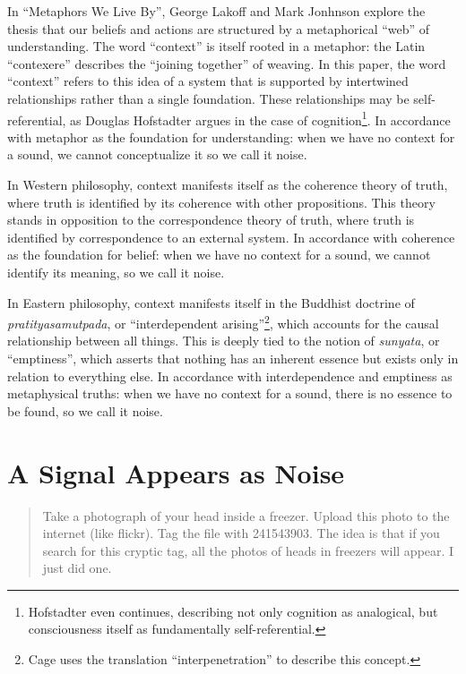 \documentclass{thesis}
\begin{document}
In ``Metaphors We Live By'', George Lakoff and Mark Jonhnson explore the thesis that our beliefs and actions are structured by a metaphorical ``web'' of understanding. The word ``context'' is itself rooted in a metaphor: the Latin ``contexere'' describes the ``joining together'' of weaving. In this paper, the word ``context'' refers to this idea of a system that is supported by intertwined relationships rather than a single foundation. These relationships may be self-referential, as Douglas Hofstadter argues in the case of cognition\cite{Hofstadter01}\footnote{Hofstadter even continues, describing not only cognition as analogical, but consciousness itself as fundamentally self-referential\cite{Hofstadter07}.}. In accordance with metaphor as the foundation for understanding: when we have no context for a sound, we cannot conceptualize it so we call it noise.

In Western philosophy, context manifests itself as the coherence theory of truth\cite{Blackburn07}\cite{young_coherence_????}, where truth is identified by its coherence with other propositions. This theory stands in opposition to the correspondence\cite{david_correspondence_????} theory of truth, where truth is identified by correspondence to an external system. In accordance with coherence as the foundation for belief: when we have no context for a sound, we cannot identify its meaning, so we call it noise.

In Eastern philosophy, context manifests itself in the Buddhist doctrine of \emph{pratityasamutpada}, or ``interdependent arising''\footnote{Cage uses the translation ``interpenetration'' to describe this concept.}, which accounts for the causal relationship between all things.\cite{Koller01} This is deeply tied to the notion of \emph{sunyata}, or ``emptiness'', which asserts that nothing has an inherent essence but exists only in relation to everything else. In accordance with interdependence and emptiness as metaphysical truths: when we have no context for a sound, there is no essence to be found, so we call it noise.

\section{A Signal Appears as Noise}

\begin{quote}
Take a photograph of your head inside a freezer. Upload this photo to the internet (like flickr). Tag the file with 241543903. The idea is that if you search for this cryptic tag, all the photos of heads in freezers will appear. I just did one.
\end{quote}
\end{document}
